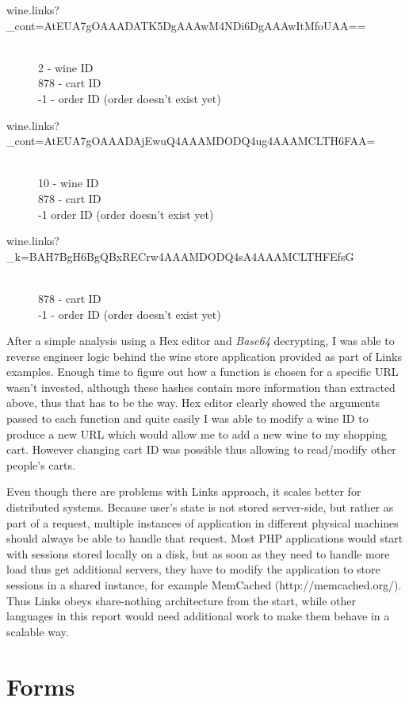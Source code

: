 \begin{description}
  \item[wine.links?\_cont=AtEUA7gOAAADATK5DgAAAwM4NDi6DgAAAwItMfoUAA==] \hfill \\
  2 - wine ID \\
  878 - cart ID \\
  -1 - order ID (order doesn't exist yet)
  \item[wine.links?\_cont=AtEUA7gOAAADAjEwuQ4AAAMDODQ4ug4AAAMCLTH6FAA=] \hfill \\
  10 - wine ID \\
  878 - cart ID \\
  -1 order ID (order doesn't exist yet)
  \item[wine.links?\_k=BAH7BgH6BgQBxRECrw4AAAMDODQ4sA4AAAMCLTHFEfsG] \hfill \\
  878 - cart ID \\
  -1 - order ID (order doesn't exist yet)
\end{description}

After a simple analysis using a Hex editor and \textit{Base64} decrypting, I was able to reverse engineer logic behind the wine store application provided as part of Links examples. Enough time to figure out how a function is chosen for a specific URL wasn't invested, although these hashes contain more information than extracted above, thus that has to be the way. Hex editor clearly showed the arguments passed to each function and quite easily I was able to modify a wine ID to produce a new URL which would allow me to add a new wine to my shopping cart. However changing cart ID was possible thus allowing to read/modify other people's carts.

Even though there are problems with Links approach, it scales better for distributed systems. Because user's state is not stored server-side, but rather as part of a request, multiple instances of application in different physical machines should always be able to handle that request. Most PHP applications would start with sessions stored locally on a disk, but as soon as they need to handle more load thus get additional servers, they have to modify the application to store sessions in a shared instance, for example MemCached (http://memcached.org/). Thus Links obeys share-nothing\citep{share-nothing} architecture from the start, while other languages in this report would need additional work to make them behave in a scalable way.

\section{Forms}

